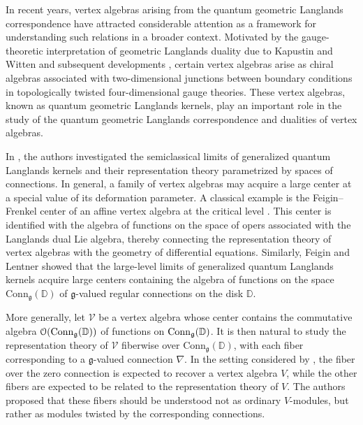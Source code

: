 \documentclass[final,reqno]{amsart}
\begin{document}
In recent years, vertex algebras arising from the quantum geometric Langlands correspondence have attracted considerable attention as a framework for understanding such relations in a broader context. Motivated by the gauge-theoretic interpretation of geometric Langlands duality due to Kapustin and Witten \cite{KW07} and subsequent developments \cite{GR19,FG20}, certain vertex algebras arise as chiral algebras associated with two-dimensional junctions between boundary conditions in topologically twisted four-dimensional gauge theories. These vertex algebras, known as quantum geometric Langlands kernels, play an important role in the study of the quantum geometric Langlands correspondence and dualities of vertex algebras.

In \cite{FL24}, the authors investigated the semiclassical limits of generalized quantum Langlands kernels and their representation theory parametrized by spaces of connections. In general, a family of vertex algebras may acquire a large center at a special value of its deformation parameter. A classical example is the Feigin--Frenkel center of an affine vertex algebra at the critical level \cite{FF92,Fre05,Fre07}. This center is identified with the algebra of functions on the space of opers associated with the Langlands dual Lie algebra, thereby connecting the representation theory of vertex algebras with the geometry of differential equations. Similarly, Feigin and Lentner showed that the large-level limits of generalized quantum Langlands kernels acquire large centers containing the algebra of functions on the space $\mathrm{Conn}_{\mathfrak g}(\mathbb{D})$ of $\mathfrak g$-valued regular connections on the disk $\mathbb{D}$.

More generally, let $\mathcal V$ be a vertex algebra whose center contains the commutative algebra $\EuScript{O}(\mathrm{Conn}_{\mathfrak g}(\mathbb{D}))$ of functions on $\mathrm{Conn}_{\mathfrak{g}}(\mathbb{D})$. It is then natural to study the representation theory of $\mathcal V$ fiberwise over $\mathrm{Conn}_{\mathfrak g}(\mathbb{D})$, with each fiber corresponding to a $\mathfrak g$-valued connection $\nabla$. In the setting considered by \cite{FL24,FL26}, the fiber over the zero connection is expected to recover a vertex algebra $V$, while the other fibers are expected to be related to the representation theory of $V$. The authors proposed that these fibers should be understood not as ordinary $V$-modules, but rather as modules twisted by the corresponding connections.
\end{document}
